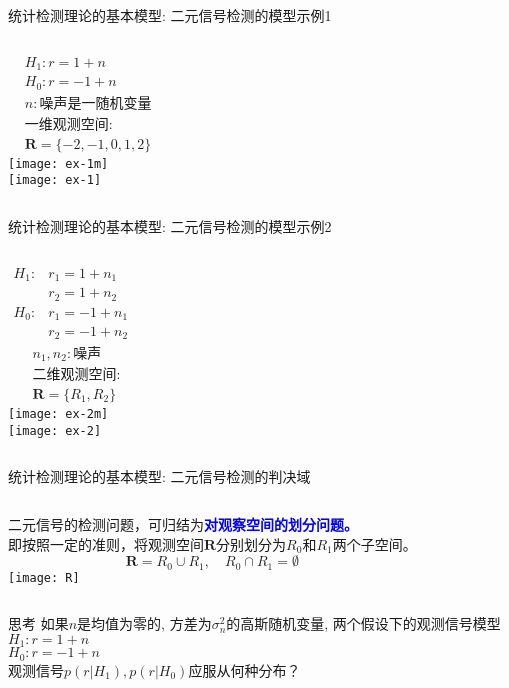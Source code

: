 \begin{frame}{统计检测理论的基本模型: 二元信号检测的模型示例1}
\begin{columns}
	\begin{align*}
	&H_1: r=1+n\\
	&H_0: r=-1+n\\
	&n:\text{噪声是一随机变量}\\
	&\text{一维观测空间:}\\
	&\bm{R}=\{-2,-1,0,1,2\}
	\end{align*}
	\texttt{[image: ex-1m]}\\
	\texttt{[image: ex-1]}
\end{columns}
\end{frame}

\begin{frame}{统计检测理论的基本模型: 二元信号检测的模型示例2}
\begin{columns}
	\begin{align*}
	H_1: &r_1=1+n_1\\
	&r_2=1+n_2\\
	H_0: &r_1=-1+n_1\\
	&r_2=-1+n_2
	\end{align*}
	\begin{align*}
	&n_1,n_2:\text{噪声}\\
	&\text{二维观测空间:}\\
	&\bm{R}=\{R_1,R_2\}
	\end{align*}
	\texttt{[image: ex-2m]}\\
	\texttt{[image: ex-2]}
\end{columns}
\end{frame}

\begin{frame}{统计检测理论的基本模型: 二元信号检测的判决域}
\begin{columns}
	二元信号的检测问题，可归结为\textcolor{blue}{\textbf{对观察空间的划分问题。}}\\
	即按照一定的准则，将观测空间$\bm{R}$分别划分为$R_0$和$R_1$两个子空间。\\
	\[\bm{R}=R_0\cup R_1,\quad R_0\cap R_1=\emptyset \]
	\texttt{[image: R]}\\
\end{columns}
\end{frame}

\begin{frame}
\begin{block}{思考}
	如果$n$是均值为零的, 方差为$\sigma_n^2$的高斯随机变量, 两个假设下的观测信号模型\\
	$H_1: r=1+n$\\
	$H_0: r=-1+n$\\
	观测信号$p(r|H_1),p(r|H_0)$应服从何种分布？
\end{block}
\end{frame}

